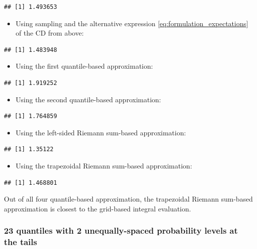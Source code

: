 \documentclass[
]{article}
\providecommand{\tightlist}{%
  \setlength{\itemsep}{0pt}\setlength{\parskip}{0pt}}
\begin{document}
\begin{verbatim}
## [1] 1.493653
\end{verbatim}

\begin{itemize}
\tightlist
\item
  Using sampling and the alternative expression
  \eqref{eq:formulation_expectations} of the CD from above:
\end{itemize}

\begin{verbatim}
## [1] 1.483948
\end{verbatim}

\begin{itemize}
\tightlist
\item
  Using the first quantile-based approximation:
\end{itemize}

\begin{verbatim}
## [1] 1.919252
\end{verbatim}

\begin{itemize}
\tightlist
\item
  Using the second quantile-based approximation:
\end{itemize}

\begin{verbatim}
## [1] 1.764859
\end{verbatim}

\begin{itemize}
\tightlist
\item
  Using the left-sided Riemann sum-based approximation:
\end{itemize}

\begin{verbatim}
## [1] 1.35122
\end{verbatim}

\begin{itemize}
\tightlist
\item
  Using the trapezoidal Riemann sum-based approximation:
\end{itemize}

\begin{verbatim}
## [1] 1.468801
\end{verbatim}

Out of all four quantile-based approximation, the trapezoidal Riemann
sum-based approximation is closest to the grid-based integral
evaluation.

\hypertarget{quantiles-with-2-unequally-spaced-probability-levels-at-the-tails}{%
\subsubsection{23 quantiles with 2 unequally-spaced probability levels
at the
tails}\label{quantiles-with-2-unequally-spaced-probability-levels-at-the-tails}}
\end{document}
